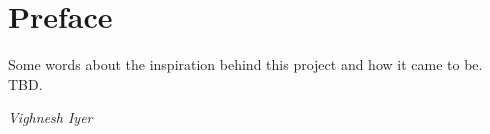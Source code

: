 \chapter*{Preface}

Some words about the inspiration behind this project and how it came to be.
TBD.

\begin{flushright}
	\textit{Vighnesh Iyer}
\end{flushright}
